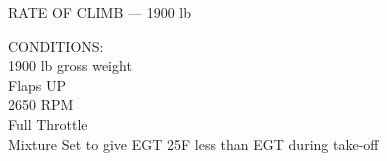 \begin{figure}[t]
\begin{center}
\begin{perfhdr}RATE OF CLIMB --- 1900 lb
\end{perfhdr}
\vspace{5ex}
\begin{minipage}{4in}
  \begin{flushleft}
    CONDITIONS:\\
    1900 lb gross weight\\
    Flaps UP\\
    2650 RPM\\
    Full Throttle\\
    Mixture Set to give EGT 25\textdegree F less than EGT during take-off\\
    \end{flushleft}
  \end{minipage}
\hfill
\\
\vspace{\perfnoteskip}

\settowidth{\colOne}{WEIGHT}
\settowidth{\colTwo}{PRESSURE}
\settowidth{\colThree}{CLIMB}
\settowidth{\colFour}{-20\textdegree C}
\settowidth{\colFive}{9,999}
\settowidth{\colSix}{9,999}
\settowidth{\colSeven}{9,999}


\end{center}
\end{figure}
